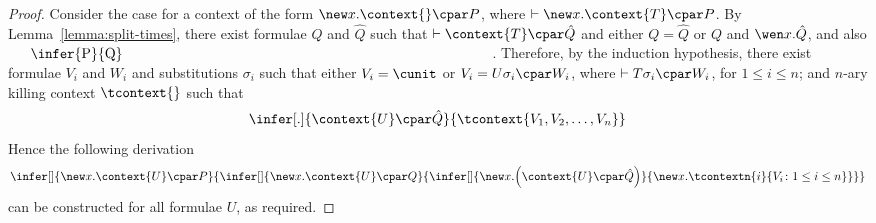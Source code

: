 \documentclass[UKenglish,acmsmall,authorversion]{acmart}
\theoremstyle{plain}
\begin{document}
\begin{proof}
Consider the case for a context of the form $\new x. \context{} \cpar P$, where $\vdash \new x. \context{ T } \cpar P$.
By Lemma~\ref{lemma:split-times},
there exist formulae $Q$ and $\hat{Q}$ such that $\vdash \context{ T } \cpar \hat{Q}$ and either $Q = \hat{Q}$ or $Q$ and $\wen x.\hat{Q}$, and also 
$
\vcenter{
\infer{P}{Q}}
$.
Therefore, by the induction hypothesis,
there exist formulae $V_i$ and $W_i$ and substitutions $\sigma_i$ such that either $V_i = \cunit$ or $V_i = U \sigma_i \cpar W_i$, where $\vdash T \sigma_i \cpar W_i$, for $1 \leq i \leq n$;
and $n$-ary killing context $\tcontext{}$
such that 
\[
\infer[.]{
\context{ U } \cpar \hat{Q}
}{
\tcontext{ V_1, V_2, \hdots, V_n }
}
\]
Hence the following derivation 
\[
\infer[]{
\new x. \context{ U } \cpar P
}{
\infer[]{
\new x. \context{ U } \cpar Q
}{
\infer[]{
\mathopen{\new x.} \left( \context{ U } \cpar \hat{Q} \right)
}{
\new x. \tcontextn{i}{ V_i \colon 1 \leq i \leq n }
}}}
\]
can be constructed for all formulae $U$, as required.

\end{proof}
\end{document}
